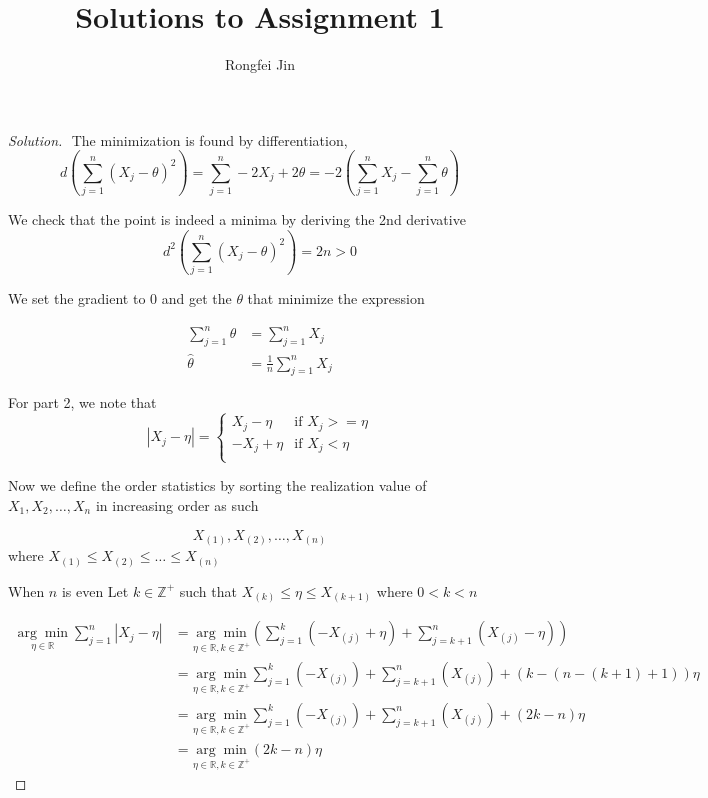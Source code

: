 \documentclass{article}
\title{Solutions to Assignment 1}
\author{Rongfei Jin}
\newenvironment{solution}
  {\renewcommand\qedsymbol{$\blacksquare$}\begin{proof}[Solution]$ $}
  {\end{proof}}
\begin{document}
\maketitle


\begin{Exercise}
    \begin{solution}
        The minimization is found by differentiation,
        \[
            d(\sum_{j=1}^{n}(X_j -\theta)^2) = \sum_{j=1}^{n} -2X_j + 2\theta = -2(\sum_{j=1}^{n}X_j - \sum_{j=1}^{n}\theta)
        \]

        We check that the point is indeed a minima by deriving the 2nd derivative
        \[
            d^2(\sum_{j=1}^{n}(X_j -\theta)^2) = 2n>0
        \]

        We set the gradient to 0 and get the \(\theta\) that minimize the expression

        \begin{align*}
            \sum_{j=1}^{n}\theta & = \sum_{j=1}^{n}X_j            \\
            \hat \theta          & = \frac{1}{n}\sum_{j=1}^{n}X_j
        \end{align*}

        For part 2, we note that \[|X_j - \eta| = \begin{cases}
                X_j - \eta   & \text{if } X_j >= \eta \\
                - X_j + \eta & \text{if } X_j < \eta  \\
            \end{cases}\]

        Now we define the order statistics by sorting the realization value of \(X_1, X_2,\ldots, X_n\) in increasing order as such

        \[X_{(1)}, X_{(2)}, \ldots, X_{(n)}\] where \(X_{(1)} \le X_{(2)} \le \ldots \le X_{(n)}\)

        When \(n\) is even
        Let \(k\in \mathbb Z^+\) such that \(X_{(k)} \le \eta \le X_{(k+1)}\) where \(0<k<n\)

        \begin{align*}
            \underset{\eta\in \mathbb R}{\arg\min}\sum_{j=1}^{n}|X_j - \eta|
             & = \underset{\eta\in \mathbb R, k\in \mathbb Z^+}{\arg\min}(\sum_{j=1}^{k}(- X_{(j)} + \eta) + \sum_{j=k+1}^{n}(X_{(j)} - \eta))      \\
             & = \underset{\eta\in \mathbb R, k\in \mathbb Z^+}{\arg\min}\sum_{j=1}^{k} (-X_{(j)}) + \sum_{j=k+1}^{n}(X_{(j)})+ (k-(n-(k+1)+1))\eta \\
             & =\underset{\eta\in \mathbb R, k\in \mathbb Z^+}{\arg\min} \sum_{j=1}^{k} (-X_{(j)}) + \sum_{j=k+1}^{n}(X_{(j)})+ (2k-n)\eta          \\
             & =\underset{\eta\in \mathbb R, k\in \mathbb Z^+}{\arg\min} (2k-n)\eta
        \end{align*}


\end{solution}
\end{Exercise}
\end{document}
